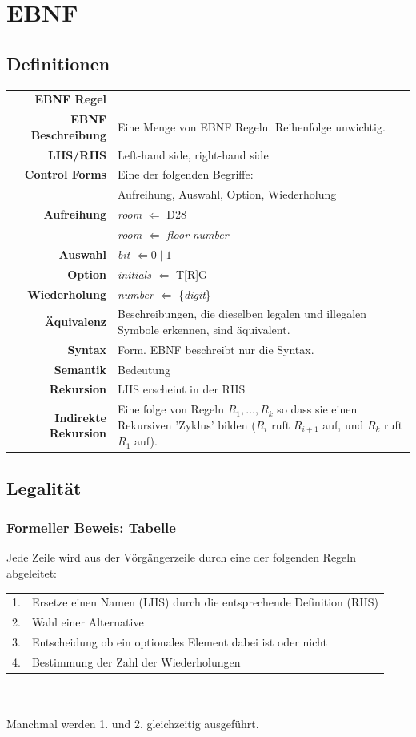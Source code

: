 \documentclass[12pt,a4paper]{article}
\begin{document}
\tableofcontents

\newpage
\section{EBNF}
\subsection{Definitionen}
\begin{tabularx}{\linewidth}{r X}
\textbf{EBNF Regel} & \\
\textbf{EBNF Beschreibung} & Eine Menge von EBNF Regeln. Reihenfolge unwichtig.\\
\textbf{LHS/RHS} & Left-hand side, right-hand side\\
\textbf{Control Forms} & Eine der folgenden Begriffe:\\
& Aufreihung, Auswahl, Option, Wiederholung\\
\quad \quad \textbf{Aufreihung} & \textit{room} $\Leftarrow$ D28\\
& \textit{room} $\Leftarrow$ \textit{floor} \textit{number}\\
\quad \quad \textbf{Auswahl} & \textit{bit} $\Leftarrow 0 \mid 1$\\
\quad \quad \textbf{Option} & \textit{initials} $\Leftarrow$ T[R]G\\
\quad \quad \textbf{Wiederholung} & \textit{number} $\Leftarrow$ \{\textit{digit}\}\\
\textbf{Äquivalenz} & Beschreibungen, die dieselben legalen und illegalen Symbole erkennen, sind äquivalent.\\
\textbf{Syntax} & Form. EBNF beschreibt nur die Syntax.\\
\textbf{Semantik} & Bedeutung\\ %
\textbf{Rekursion} & LHS erscheint in der RHS\\
\textbf{Indirekte Rekursion} & Eine folge von Regeln $R_1, \hdots, R_k$ so dass sie einen Rekursiven 'Zyklus' bilden ($R_i$ ruft $R_{i+1}$ auf, und $R_k$ ruft $R_1$ auf).
\end{tabularx}
\newpage
\subsection{Legalität}
\subsubsection{Formeller Beweis: Tabelle}
Jede Zeile wird aus der Vörgängerzeile durch eine der folgenden Regeln abgeleitet:\\
\begin{tabularx}{\linewidth}{l X}
1. & Ersetze einen Namen (LHS) durch die entsprechende Definition (RHS)\\
2. & Wahl einer Alternative\\
3. & Entscheidung ob ein optionales Element dabei ist oder nicht\\
4. & Bestimmung der Zahl der Wiederholungen
\end{tabularx}\\\\
Manchmal werden 1. und 2. gleichzeitig ausgeführt.
\end{document}
